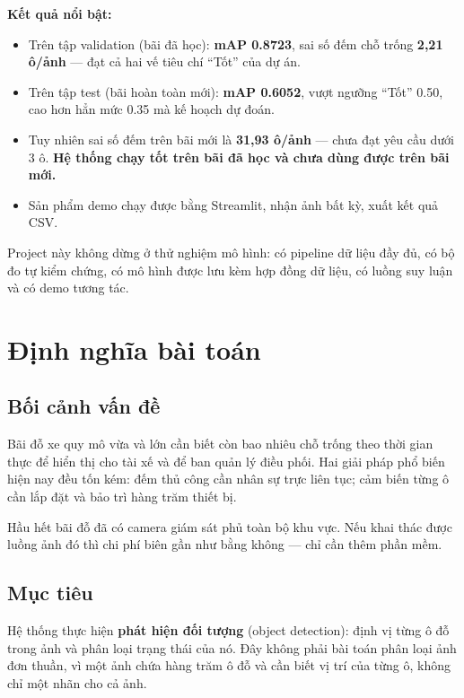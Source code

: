 \documentclass[12pt]{ai_conquer2026}
\begin{document}
\textbf{Kết quả nổi bật:}

\begin{itemize}
\item Trên tập validation (bãi đã học): \textbf{mAP 0.8723}, sai số đếm chỗ trống \textbf{2,21 ô/ảnh} --- đạt cả hai vế tiêu chí ``Tốt'' của dự án.
\item Trên tập test (bãi hoàn toàn mới): \textbf{mAP 0.6052}, vượt ngưỡng ``Tốt'' 0.50, cao hơn hẳn mức 0.35 mà kế hoạch dự đoán.
\item Tuy nhiên sai số đếm trên bãi mới là \textbf{31,93 ô/ảnh} --- chưa đạt yêu cầu dưới 3 ô. \textbf{Hệ thống chạy tốt trên bãi đã học và chưa dùng được trên bãi mới.}
\item Sản phẩm demo chạy được bằng Streamlit, nhận ảnh bất kỳ, xuất kết quả CSV.
\end{itemize}

Project này không dừng ở thử nghiệm mô hình: có pipeline dữ liệu đầy đủ, có bộ đo tự kiểm chứng, có mô hình được lưu kèm hợp đồng dữ liệu, có luồng suy luận và có demo tương tác.

\newpage
\setcounter{tocdepth}{2}
\tableofcontents
\thispagestyle{fancy}

\newpage
\section{Định nghĩa bài toán}

\subsection{Bối cảnh vấn đề}

Bãi đỗ xe quy mô vừa và lớn cần biết còn bao nhiêu chỗ trống theo thời gian thực để hiển thị cho tài xế và để ban quản lý điều phối. Hai giải pháp phổ biến hiện nay đều tốn kém: đếm thủ công cần nhân sự trực liên tục; cảm biến từng ô cần lắp đặt và bảo trì hàng trăm thiết bị.

Hầu hết bãi đỗ đã có camera giám sát phủ toàn bộ khu vực. Nếu khai thác được luồng ảnh đó thì chi phí biên gần như bằng không --- chỉ cần thêm phần mềm.

\subsection{Mục tiêu}

Hệ thống thực hiện \textbf{phát hiện đối tượng} (object detection): định vị từng ô đỗ trong ảnh và phân loại trạng thái của nó. Đây không phải bài toán phân loại ảnh đơn thuần, vì một ảnh chứa hàng trăm ô đỗ và cần biết vị trí của từng ô, không chỉ một nhãn cho cả ảnh.
\end{document}
